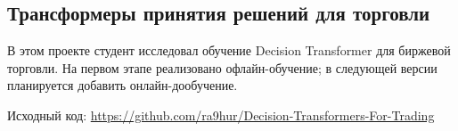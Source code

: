 \documentclass[11pt,a4paper]{article}
\begin{document}
\subsection{Трансформеры принятия решений для торговли}\label{decision-transformers-for-trading}

В этом проекте студент исследовал обучение Decision Transformer для биржевой торговли. На первом этапе реализовано офлайн-обучение; в следующей версии планируется добавить онлайн-дообучение.


Исходный код: \url{https://github.com/ra9hur/Decision-Transformers-For-Trading}
\end{document}
